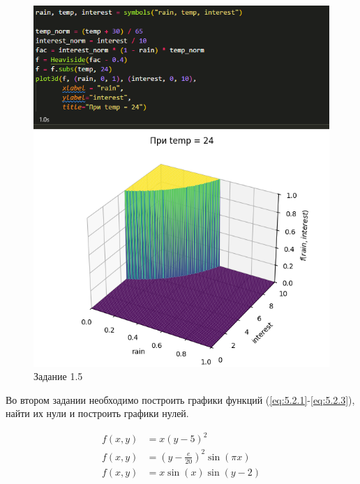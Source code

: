 \documentclass[14pt,a4paper]{extarticle}
\begin{document}
\begin{figure}
    [ht!]\centering
    \includegraphics[width=0.8\linewidth]{figures/5.1/5.png}
    \caption{Задание 1.5}
    \label{pic:5.1.5}
\end{figure}
\newpage

Во втором задании необходимо построить графики функций (\ref{eq:5.2.1}-\ref{eq:5.2.3}), найти
их нули и построить графики нулей.

\begin{align}
    \label{eq:5.2.1}
    f(x, y) &= x(y - 5) ^ 2 \\
    \label{eq:5.2.2}
    f(x, y) &= (y - \frac{e}{20})^2 \sin(\pi x) \\
    \label{eq:5.2.3}
    f(x, y) &= x \sin (x) \sin(y - 2)
\end{align}
\end{document}
